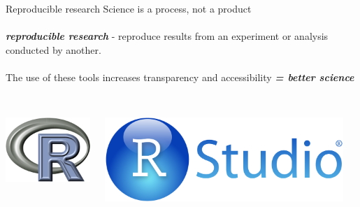 \documentclass[serif]{beamer}\usepackage[]{graphicx}\usepackage[]{color}
\newcommand{\emtxt}[1]{\textbf{\textit{#1}}}
\begin{document}
\begin{frame}{Reproducible research}
Science is a process, not a product \\~\\
\emtxt{reproducible research} - reproduce results from an experiment or analysis conducted by another.\\~\\
The use of these tools increases transparency and accessibility \emtxt{= better science}\\~\\
\begin{columns}
\begin{column}{0.2\textwidth}
\centerline{\includegraphics[width = \textwidth]{fig/Rlogo.png}}
\end{column}
\begin{column}{0.2\textwidth}
\centerline{\includegraphics[width = \textwidth]{fig/RStudio.png}}
\end{column}
\begin{column}{0.2\textwidth}

\end{column}
\end{columns}
\end{frame}
\end{document}

